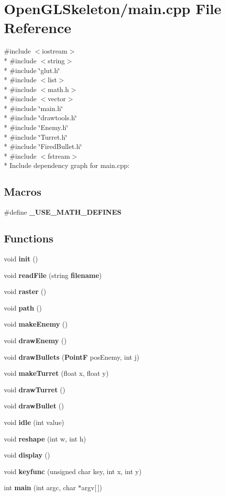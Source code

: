 \section{Open\+G\+L\+Skeleton/main.cpp File Reference}
\label{main_8cpp}
{\ttfamily \#include $<$iostream$>$}\\*
{\ttfamily \#include $<$string$>$}\\*
{\ttfamily \#include \char`\"{}glut.\+h\char`\"{}}\\*
{\ttfamily \#include $<$list$>$}\\*
{\ttfamily \#include $<$math.\+h$>$}\\*
{\ttfamily \#include $<$vector$>$}\\*
{\ttfamily \#include \char`\"{}main.\+h\char`\"{}}\\*
{\ttfamily \#include \char`\"{}drawtools.\+h\char`\"{}}\\*
{\ttfamily \#include \char`\"{}Enemy.\+h\char`\"{}}\\*
{\ttfamily \#include \char`\"{}Turret.\+h\char`\"{}}\\*
{\ttfamily \#include \char`\"{}Fired\+Bullet.\+h\char`\"{}}\\*
{\ttfamily \#include $<$fstream$>$}\\*
Include dependency graph for main.\+cpp\+:
\subsection*{Macros}
\begin{DoxyCompactItemize}
\item 
\#define {\bf \+\_\+\+U\+S\+E\+\_\+\+M\+A\+T\+H\+\_\+\+D\+E\+F\+I\+N\+ES}
\end{DoxyCompactItemize}
\subsection*{Functions}
\begin{DoxyCompactItemize}
\item 
void {\bf init} ()
\item 
void {\bf read\+File} (string {\bf filename})
\item 
void {\bf raster} ()
\item 
void {\bf path} ()
\item 
void {\bf make\+Enemy} ()
\item 
void {\bf draw\+Enemy} ()
\item 
void {\bf draw\+Bullets} ({\bf PointF} pos\+Enemy, int j)
\item 
void {\bf make\+Turret} (float x, float y)
\item 
void {\bf draw\+Turret} ()
\item 
void {\bf draw\+Bullet} ()
\item 
void {\bf idle} (int value)
\item 
void {\bf reshape} (int w, int h)
\item 
void {\bf display} ()
\item 
void {\bf keyfunc} (unsigned char key, int x, int y)
\item 
int {\bf main} (int argc, char $\ast$argv[$\,$])
\end{DoxyCompactItemize}
